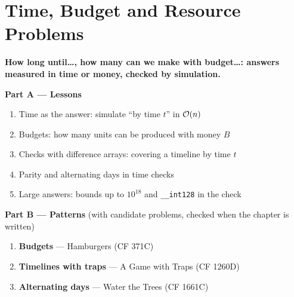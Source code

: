 \chapter{Time, Budget and Resource Problems}
\label{ch:time_budget}

\begin{tcolorbox}[enhanced, colback=white, colframe=secondaryblue, boxrule=1pt, arc=2mm]
\textbf{\large\textcolor{primaryblue}{How long until\ldots, how many can we make with budget\ldots: answers measured in time or money, checked by simulation.}}
\end{tcolorbox}


\begin{plannedbox}
\textbf{Part A --- Lessons}
\begin{enumerate}[leftmargin=*, label=\textbf{A\arabic*.}, itemsep=1pt]
    \item Time as the answer: simulate ``by time $t$'' in $\mathcal{O}(n)$
    \item Budgets: how many units can be produced with money $B$
    \item Checks with difference arrays: covering a timeline by time $t$
    \item Parity and alternating days in time checks
    \item Large answers: bounds up to $10^{18}$ and \texttt{\_\_int128} in the check
\end{enumerate}
\textbf{Part B --- Patterns} (with candidate problems, checked when the chapter is written)
\begin{enumerate}[leftmargin=*, label=\textbf{P\arabic*.}, itemsep=1pt]
    \item \textbf{Budgets} --- Hamburgers {\small\color{darkgray}(CF 371C)}
    \item \textbf{Timelines with traps} --- A Game with Traps {\small\color{darkgray}(CF 1260D)}
    \item \textbf{Alternating days} --- Water the Trees {\small\color{darkgray}(CF 1661C)}
\end{enumerate}
\end{plannedbox}
